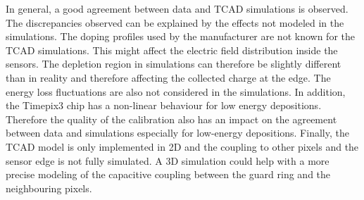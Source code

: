 In general, a good agreement between data and TCAD simulations is
observed. The discrepancies observed can be explained by the effects
not modeled in the simulations. The doping profiles used by the
manufacturer are not known for the TCAD simulations. This might affect
the electric field distribution inside the sensors. The depletion
region in simulations can therefore be slightly different than in
reality and therefore affecting the collected charge at the edge. The
energy loss fluctuations are also not considered in the
simulations. In addition, the Timepix3 chip has a non-linear behaviour
for low energy depositions. Therefore the quality of the calibration
also has an impact on the agreement between data and simulations
especially for low-energy depositions. Finally, the TCAD model is only
implemented in 2D and the coupling to other pixels and the sensor edge
is not fully simulated. A 3D simulation could help with a more precise
modeling of the capacitive coupling between the guard ring and the
neighbouring pixels.







